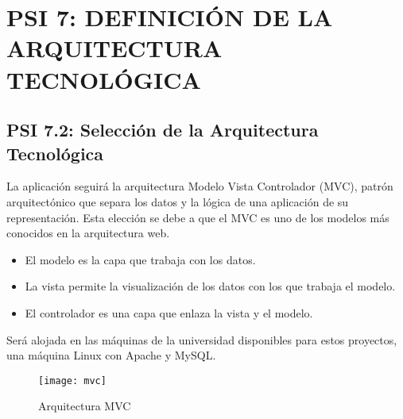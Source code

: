 % 
%
%
%


% 


\newpage

\section{PSI 7: DEFINICIÓN DE LA ARQUITECTURA TECNOLÓGICA}


\subsection{PSI 7.2: Selección de la Arquitectura Tecnológica}\label{sec:arq-tec}
La aplicación seguirá la arquitectura Modelo Vista Controlador (MVC), patrón arquitectónico que separa los datos y la lógica de una aplicación de su representación. Esta elección se debe a que el MVC es uno de los modelos más conocidos en la arquitectura web.
\begin{itemize}
\item El modelo es la capa que trabaja con los datos.
\item La vista permite la visualización de los datos con los que trabaja el modelo.
\item El controlador es una capa que enlaza la vista y el modelo.
\end{itemize}
\par Será alojada en las máquinas de la universidad disponibles para estos proyectos, una máquina Linux con Apache y MySQL.
\begin{figure}[H]
\vspace{4mm}
\centering
\centerline{\texttt{[image: mvc]}}
\caption{Arquitectura MVC}
\end{figure}